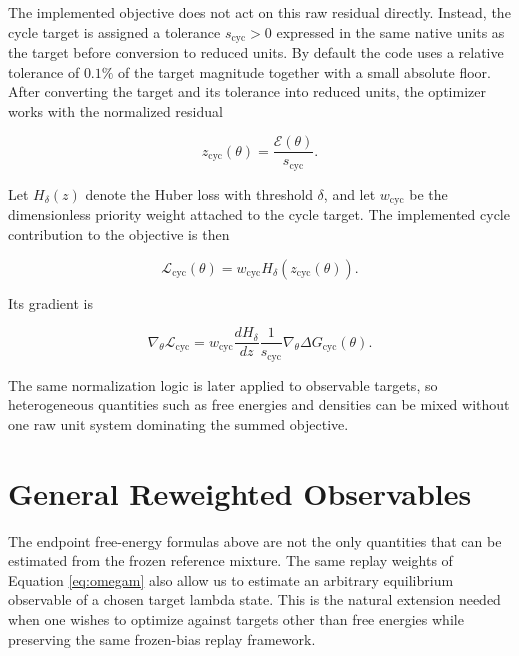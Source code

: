 The implemented objective does not act on this raw residual directly. Instead, the cycle target is assigned a tolerance $s_{\mathrm{cyc}} > 0$ expressed in the same native units as the target before conversion to reduced units. By default the code uses a relative tolerance of $0.1\%$ of the target magnitude together with a small absolute floor. After converting the target and its tolerance into reduced units, the optimizer works with the normalized residual

\begin{equation}
    z_{\mathrm{cyc}}(\theta)
    =
    \frac{\mathcal{E}(\theta)}{s_{\mathrm{cyc}}}.
    \label{eq:normalized_cycle_residual}
\end{equation}

Let $H_\delta(z)$ denote the Huber loss with threshold $\delta$, and let $w_{\mathrm{cyc}}$ be the dimensionless priority weight attached to the cycle target. The implemented cycle contribution to the objective is then

\begin{equation}
    \mathcal{L}_{\mathrm{cyc}}(\theta)
    =
    w_{\mathrm{cyc}} H_\delta\!\left(z_{\mathrm{cyc}}(\theta)\right).
    \label{eq:cycle_huber_loss}
\end{equation}

Its gradient is

\begin{equation}
    \nabla_\theta \mathcal{L}_{\mathrm{cyc}}
    =
    w_{\mathrm{cyc}}
    \frac{d H_\delta}{dz}
    \frac{1}{s_{\mathrm{cyc}}}
    \nabla_\theta \Delta G_{\mathrm{cyc}}(\theta).
    \label{eq:lossgradtheta}
\end{equation}

The same normalization logic is later applied to observable targets, so heterogeneous quantities such as free energies and densities can be mixed without one raw unit system dominating the summed objective.

\section{General Reweighted Observables}

The endpoint free-energy formulas above are not the only quantities that can be estimated from the frozen reference mixture. The same replay weights of Equation \eqref{eq:omegam} also allow us to estimate an arbitrary equilibrium observable of a chosen target lambda state. This is the natural extension needed when one wishes to optimize against targets other than free energies while preserving the same frozen-bias replay framework.

